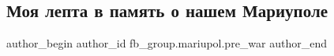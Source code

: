  
 
 
 
 

\subsection{Моя лепта в память о нашем Мариуполе}
\label{sec:09_01_2023.fb.fb_group.mariupol.pre_war.2.moya_lepta_v_pamyat_}

\ifcmt
 author_begin
   author_id fb_group.mariupol.pre_war
 author_end
\fi
